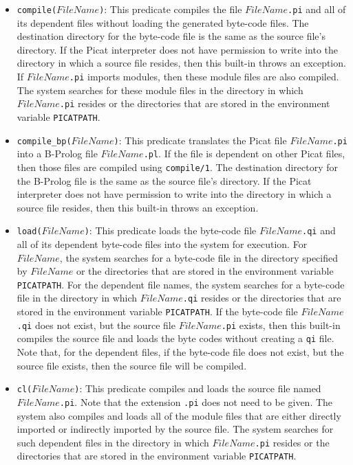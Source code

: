 \begin{itemize}
\item \texttt{compile($FileName$)}: This predicate compiles the file \texttt{$FileName$.pi} and all of its dependent files without loading the generated byte-code files.  The destination directory for the byte-code file is the same as the source file's directory.  If the Picat interpreter does not have permission to write into the directory in which a source file resides, then this built-in throws an exception. If \texttt{$FileName$.pi} imports modules, then these module files are also compiled. The system searches for these module files in the directory in which \texttt{$FileName$.pi} resides or the directories that are stored in the environment variable \texttt{PICATPATH}.

\item \texttt{compile\_bp($FileName$)}: This predicate translates the Picat file \texttt{$FileName$.pi} into a B-Prolog file \texttt{$FileName$.pl}.  If the file is dependent on other Picat files, then those files are compiled using \texttt{compile/1}.  The destination directory for the B-Prolog file is the same as the source file's directory.  If the Picat interpreter does not have permission to write into the directory in which a source file resides, then this built-in throws an exception.

\item \texttt{load($FileName$)}: This predicate loads the byte-code file \texttt{$FileName$.qi} and all of its dependent byte-code files into the system for execution.  For $FileName$, the system searches for a byte-code file in the directory specified by $FileName$ or the directories that are stored in the environment variable \texttt{PICATPATH}. For the dependent file names, the system searches for a byte-code file in the directory in which \texttt{$FileName$.qi} resides or the directories that are stored in the environment variable \texttt{PICATPATH}. If the byte-code file \texttt{$FileName$.qi} does not exist, but the source file \texttt{$FileName$.pi} exists, then this built-in compiles the source file and loads the byte codes without creating a \texttt{qi} file.  Note that, for the dependent files, if the byte-code file does not exist, but the source file exists, then the source file will be compiled.

\item \texttt{cl($FileName$)}: This predicate compiles and loads the source file named \texttt{$FileName$.pi}.  Note that the extension \texttt{.pi} does not need to be given.  The system also compiles and loads all of the module files that are either directly imported or indirectly imported by the source file.  The system searches for such dependent files in the directory in which \texttt{$FileName$.pi} resides or the directories that are stored in the environment variable \texttt{PICATPATH}.  


\end{itemize}
